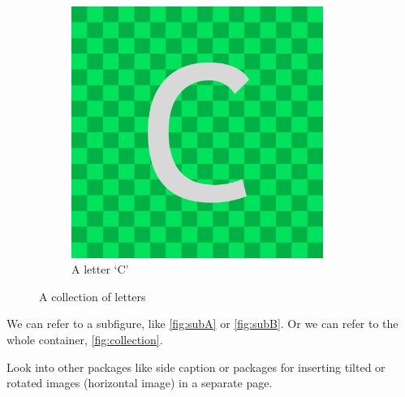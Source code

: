 \documentclass[a4paper, 11pt]{article}
\begin{document}
\begin{figure}[htbp]
    \begin{subfigure}{0.45\textwidth}
        \centering
        \includegraphics[width=0.9\textwidth]{ImageC}
        \caption{A letter `C'}
        \label{fig:subC}
    \end{subfigure}

    \caption{A collection of letters}
    \label{fig:collection}
\end{figure}

We can refer to a subfigure, like \autoref{fig:subA} or \ref{fig:subB}. Or we can refer to the whole container, \autoref{fig:collection}. 

\kant[4-7]

Look into other packages like side caption or packages for inserting tilted or rotated images (horizontal image) in a separate page.
\end{document}
